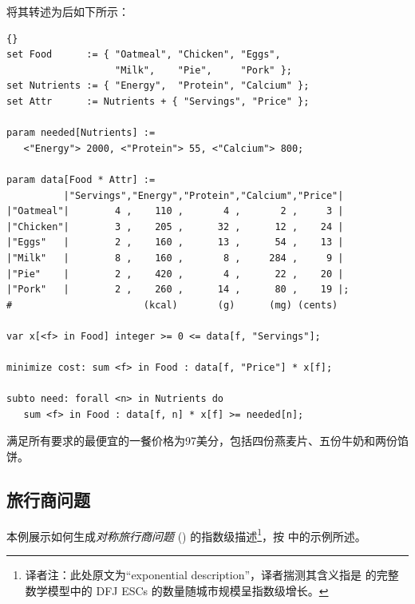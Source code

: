\noindent 将其转述为\zimpl 后如下所示：

\medskip
{}
\begin{lstlisting}[frame=tb]{}
set Food      := { "Oatmeal", "Chicken", "Eggs",
                   "Milk",    "Pie",     "Pork" };
set Nutrients := { "Energy",  "Protein", "Calcium" };
set Attr      := Nutrients + { "Servings", "Price" };

param needed[Nutrients] :=
   <"Energy"> 2000, <"Protein"> 55, <"Calcium"> 800;

param data[Food * Attr] :=
          |"Servings","Energy","Protein","Calcium","Price"|
|"Oatmeal"|        4 ,    110 ,       4 ,       2 ,     3 |
|"Chicken"|        3 ,    205 ,      32 ,      12 ,    24 |
|"Eggs"   |        2 ,    160 ,      13 ,      54 ,    13 |
|"Milk"   |        8 ,    160 ,       8 ,     284 ,     9 |
|"Pie"    |        2 ,    420 ,       4 ,      22 ,    20 |
|"Pork"   |        2 ,    260 ,      14 ,      80 ,    19 |;
#                       (kcal)       (g)      (mg) (cents)

var x[<f> in Food] integer >= 0 <= data[f, "Servings"];

minimize cost: sum <f> in Food : data[f, "Price"] * x[f];

subto need: forall <n> in Nutrients do
   sum <f> in Food : data[f, n] * x[f] >= needed[n];
\end{lstlisting}

\medskip
\noindent 满足所有要求的最便宜的一餐价格为97美分，包括四份燕麦片、五份牛奶和两份馅饼。


\subsection{旅行商问题}
本例展示如何生成\emph{对称旅行商问题} (\tsp) 的指数级描述\footnote{
  译者注：此处原文为“exponential description”，译者揣测其含义指是
  \tsp 的完整数学模型中的 DFJ ESCs 的数量随城市规模呈指数级增长。
}，按 \cite[Section 58.5]{Schrijver2003} 中的示例所述。

